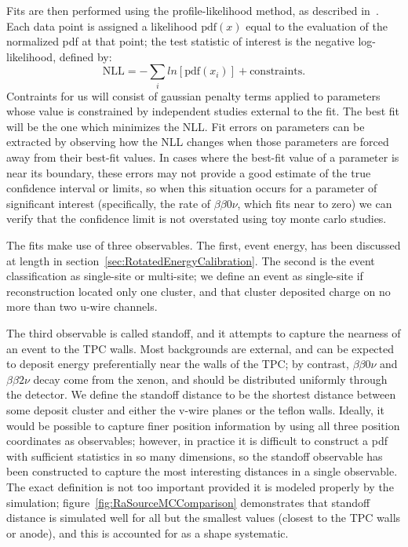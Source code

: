 Fits are then performed using the profile-likelihood method, as described in~\cite{ProfileLikelihood}.  Each data point is assigned a likelihood $\text{pdf}(x)$ equal to the evaluation of the normalized pdf at that point; the test statistic of interest is the negative log-likelihood, defined by:
\begin{equation}
\text{NLL} = -\sum_i ln\left[\text{pdf}(x_i)\right] + \text{constraints}.
\end{equation}
Contraints for us will consist of gaussian penalty terms applied to parameters whose value is constrained by independent studies external to the fit.  The best fit will be the one which minimizes the NLL.  Fit errors on parameters can be extracted by observing how the NLL changes when those parameters are forced away from their best-fit values.  In cases where the best-fit value of a parameter is near its boundary, these errors may not provide a good estimate of the true confidence interval or limits, so when this situation occurs for a parameter of significant interest (specifically, the rate of $\beta\beta 0\nu$, which fits near to zero) we can verify that the confidence limit is not overstated using toy monte carlo studies.~\cite{FittingDocument}

The fits make use of three observables.  The first, event energy, has been discussed at length in section~\ref{sec:RotatedEnergyCalibration}.  The second is the event classification as single-site or multi-site; we define an event as single-site if reconstruction located only one cluster, and that cluster deposited charge on no more than two u-wire channels.~\cite{FittingDocument}

The third observable is called standoff, and it attempts to capture the nearness of an event to the TPC walls.  Most backgrounds are external, and can be expected to deposit energy preferentially near the walls of the TPC; by contrast, $\beta\beta 0\nu$ and $\beta\beta 2\nu$ decay come from the xenon, and should be distributed uniformly through the detector.  We define the standoff distance to be the shortest distance between some deposit cluster and either the v-wire planes or the teflon walls.  Ideally, it would be possible to capture finer position information by using all three position coordinates as observables; however, in practice it is difficult to construct a pdf with sufficient statistics in so many dimensions, so the standoff observable has been constructed to capture the most interesting distances in a single observable.  The exact definition is not too important provided it is modeled properly by the simulation; figure~\ref{fig:RaSourceMCComparison} demonstrates that standoff distance is simulated well for all but the smallest values (closest to the TPC walls or anode), and this is accounted for as a shape systematic.~\cite{FittingDocument}

